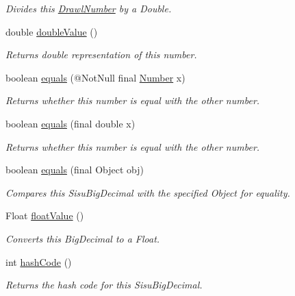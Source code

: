 \begin{DoxyCompactItemize}
\begin{DoxyCompactList}\small\item\em Divides this \hyperlink{classcom_1_1aarrelaakso_1_1drawl_1_1_drawl_number}{Drawl\+Number} by a Double. \end{DoxyCompactList}\item 
double \hyperlink{classcom_1_1aarrelaakso_1_1drawl_1_1_drawl_number_af5e6d77e51e7b6167d18acec2eb26877}{double\+Value} ()
\begin{DoxyCompactList}\small\item\em Returns double representation of this number. \end{DoxyCompactList}\item 
boolean \hyperlink{classcom_1_1aarrelaakso_1_1drawl_1_1_drawl_number_ad5b1c1aea2f1d2d04a9064a3041059c5}{equals} (@Not\+Null final \hyperlink{interfacecom_1_1aarrelaakso_1_1drawl_1_1_number}{Number} x)
\begin{DoxyCompactList}\small\item\em Returns whether this number is equal with the other number. \end{DoxyCompactList}\item 
boolean \hyperlink{classcom_1_1aarrelaakso_1_1drawl_1_1_drawl_number_a09dfa96894d84cc9734e41bf4a88ae3b}{equals} (final double x)
\begin{DoxyCompactList}\small\item\em Returns whether this number is equal with the other number. \end{DoxyCompactList}\item 
boolean \hyperlink{classcom_1_1aarrelaakso_1_1drawl_1_1_drawl_number_a54d65831347b02b14569ddfc021a4ade}{equals} (final Object obj)
\begin{DoxyCompactList}\small\item\em Compares this Sisu\+Big\+Decimal with the specified Object for equality. \end{DoxyCompactList}\item 
Float \hyperlink{classcom_1_1aarrelaakso_1_1drawl_1_1_drawl_number_ae8442cbd5cc7ab0c35c0302b196b3819}{float\+Value} ()
\begin{DoxyCompactList}\small\item\em Converts this Big\+Decimal to a Float. \end{DoxyCompactList}\item 
int \hyperlink{classcom_1_1aarrelaakso_1_1drawl_1_1_drawl_number_a0048361007923e4b902a4581eb9ba45c}{hash\+Code} ()
\begin{DoxyCompactList}\small\item\em Returns the hash code for this Sisu\+Big\+Decimal. \end{DoxyCompactList}\item 

\end{DoxyCompactItemize}

